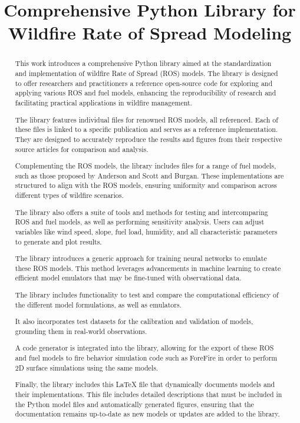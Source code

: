\documentclass{article}
\title{Comprehensive Python Library for Wildfire Rate of Spread Modeling}
\author{}
\date{}
\begin{document}
	
	\maketitle
	\tableofcontents
	\newpage
	
	\begin{abstract}
		This work introduces a comprehensive Python library aimed at the standardization and implementation of wildfire Rate of Spread (ROS) models. The library is designed to offer researchers and practitioners a reference open-source code for exploring and applying various ROS and fuel models, enhancing the reproducibility of research and facilitating practical applications in wildfire management.
		
		The library features individual files for renowned ROS models, all referenced. Each of these files is linked to a specific publication and serves as a reference implementation. They are designed to accurately reproduce the results and figures from their respective source articles for comparison and analysis.
		
		Complementing the ROS models, the library includes files for a range of fuel models, such as those proposed by Anderson and Scott and Burgan. These implementations are structured to align with the ROS models, ensuring uniformity and comparison across different types of wildfire scenarios.
		
		The library also offers a suite of tools and methods for testing and intercomparing ROS and fuel models, as well as performing sensitivity analysis. Users can adjust variables like wind speed, slope, fuel load, humidity, and all characteristic parameters to generate and plot results.
		
		The library introduces a generic approach for training neural networks to emulate these ROS models. This method leverages advancements in machine learning to create efficient model emulators that may be fine-tuned with observational data.
		
		The library includes functionality to test and compare the computational efficiency of the different model formulations, as well as emulators.
		
		It also incorporates test datasets for the calibration and validation of models, grounding them in real-world observations.
		
		A code generator is integrated into the library, allowing for the export of these ROS and fuel models to fire behavior simulation code such as ForeFire in order to perform 2D surface simulations using the same models.
		
		Finally, the library includes this \LaTeX{} file that dynamically documents models and their implementations. This file includes detailed descriptions that must be included in the Python model files and automatically generated figures, ensuring that the documentation remains up-to-date as new models or updates are added to the library.
	\end{abstract}
	
\end{document}
